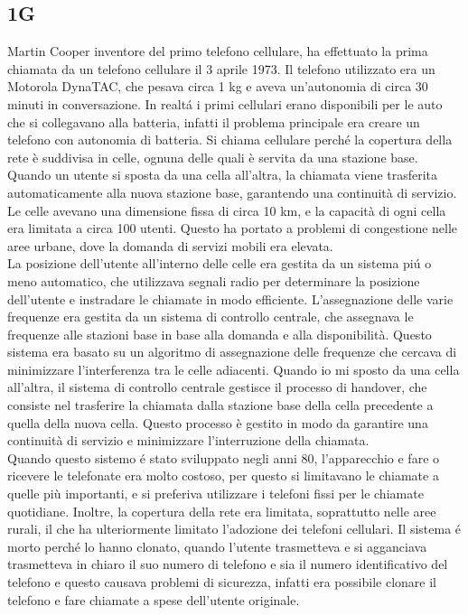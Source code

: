 \subsection{1G}
Martin Cooper inventore del primo telefono cellulare, ha effettuato la prima chiamata da un telefono cellulare il 3 aprile 1973. Il telefono utilizzato era un Motorola DynaTAC, che pesava circa 1 kg e aveva un'autonomia di circa 30 minuti in conversazione.
In realtá i primi cellulari erano disponibili per le auto che si collegavano alla batteria, infatti il problema principale era creare un telefono con autonomia di batteria.
Si chiama cellulare perché la copertura della rete è suddivisa in celle, ognuna delle quali è servita da una stazione base. Quando un utente si sposta da una cella all'altra, la chiamata viene trasferita automaticamente alla nuova stazione base, garantendo una continuità di servizio.
Le celle avevano una dimensione fissa di circa 10 km, e la capacità di ogni cella era limitata a circa 100 utenti. Questo ha portato a problemi di congestione nelle aree urbane, dove la domanda di servizi mobili era elevata.\\
La posizione dell'utente all'interno delle celle era gestita da un sistema piú o meno automatico, che utilizzava segnali radio per determinare la posizione dell'utente e instradare le chiamate in modo efficiente.
L'assegnazione delle varie frequenze era gestita da un sistema di controllo centrale, che assegnava le frequenze alle stazioni base in base alla domanda e alla disponibilità. Questo sistema era basato su un algoritmo di assegnazione delle frequenze che cercava di minimizzare l'interferenza tra le celle adiacenti. Quando io mi sposto da una cella all'altra, il sistema di controllo centrale gestisce il processo di handover, che consiste nel trasferire la chiamata dalla stazione base della cella precedente a quella della nuova cella. Questo processo è gestito in modo da garantire una continuità di servizio e minimizzare l'interruzione della chiamata.\\
Quando questo sistemo é stato sviluppato negli anni 80, l'apparecchio e fare o ricevere le telefonate era molto costoso, per questo si limitavano le chiamate a quelle più importanti, e si preferiva utilizzare i telefoni fissi per le chiamate quotidiane. Inoltre, la copertura della rete era limitata, soprattutto nelle aree rurali, il che ha ulteriormente limitato l'adozione dei telefoni cellulari.
Il sistema é morto perché lo hanno clonato, quando l'utente trasmetteva e si agganciava trasmetteva in chiaro il suo numero di telefono e sia il numero identificativo del telefono e questo causava problemi di sicurezza, infatti era possibile clonare il telefono e fare chiamate a spese dell'utente originale. 
